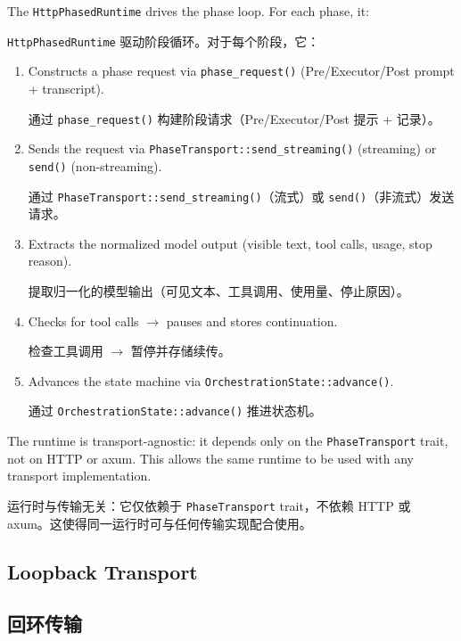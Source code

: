 The \texttt{HttpPhasedRuntime} drives the phase loop. For each phase, it:
\begin{chinese}
\texttt{HttpPhasedRuntime} 驱动阶段循环。对于每个阶段，它：
\end{chinese}
\begin{enumerate}[nosep]
    \item Constructs a phase request via \texttt{phase\_request()} (Pre/Executor/Post prompt + transcript).
    \begin{chinese}
    通过 \texttt{phase\_request()} 构建阶段请求（Pre/Executor/Post 提示 + 记录）。
    \end{chinese}
    \item Sends the request via \texttt{PhaseTransport::send\_streaming()} (streaming) or \texttt{send()} (non-streaming).
    \begin{chinese}
    通过 \texttt{PhaseTransport::send\_streaming()}（流式）或 \texttt{send()}（非流式）发送请求。
    \end{chinese}
    \item Extracts the normalized model output (visible text, tool calls, usage, stop reason).
    \begin{chinese}
    提取归一化的模型输出（可见文本、工具调用、使用量、停止原因）。
    \end{chinese}
    \item Checks for tool calls $\rightarrow$ pauses and stores continuation.
    \begin{chinese}
    检查工具调用 $\rightarrow$ 暂停并存储续传。
    \end{chinese}
    \item Advances the state machine via \texttt{OrchestrationState::advance()}.
    \begin{chinese}
    通过 \texttt{OrchestrationState::advance()} 推进状态机。
    \end{chinese}
\end{enumerate}

The runtime is transport-agnostic: it depends only on the \texttt{PhaseTransport} trait, not on HTTP or axum. This allows the same runtime to be used with any transport implementation.
\begin{chinese}
运行时与传输无关：它仅依赖于 \texttt{PhaseTransport} trait，不依赖 HTTP 或 axum。这使得同一运行时可与任何传输实现配合使用。
\end{chinese}

\subsection{Loopback Transport}
\begin{chinese}
\subsection{回环传输}
\end{chinese}

